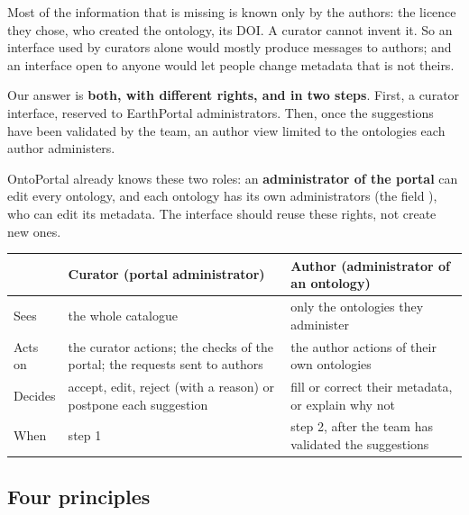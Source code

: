 \documentclass[11pt,a4paper]{article}
\begin{document}
Most of the information that is missing is known only by the authors: the licence they chose, who
created the ontology, its DOI. A curator cannot invent it. So an interface used by curators alone would
mostly produce messages to authors; and an interface open to anyone would let people change metadata
that is not theirs.

\begin{keypoint}
Our answer is \textbf{both, with different rights, and in two steps}. First, a curator interface,
reserved to EarthPortal administrators. Then, once the suggestions have been validated by the team, an
author view limited to the ontologies each author administers.
\end{keypoint}

OntoPortal already knows these two roles: an \textbf{administrator of the portal} can edit every
ontology, and each ontology has its own administrators (the field ), who can edit
its metadata. The interface should reuse these rights, not create new ones.

\noindent\begin{minipage}{\linewidth}
\begin{center}\small\renewcommand{\arraystretch}{1.25}
\begin{tabular}{@{}>{\raggedright\arraybackslash}p{2.6cm}>{\raggedright\arraybackslash}p{6.0cm}>{\raggedright\arraybackslash}p{6.0cm}@{}}
\toprule
& \textbf{Curator (portal administrator)} & \textbf{Author (administrator of an ontology)} \\
\midrule
Sees & the whole catalogue & only the ontologies they administer \\
Acts on & the curator actions; the checks of the portal; the requests sent to authors & the author actions of their own ontologies \\
Decides & accept, edit, reject (with a reason) or postpone each suggestion & fill or correct their metadata, or explain why not \\
When & step 1 & step 2, after the team has validated the suggestions \\
\bottomrule
\end{tabular}
\label{tab:roles}
\end{center}
\end{minipage}


\subsection{Four principles}
\end{document}
